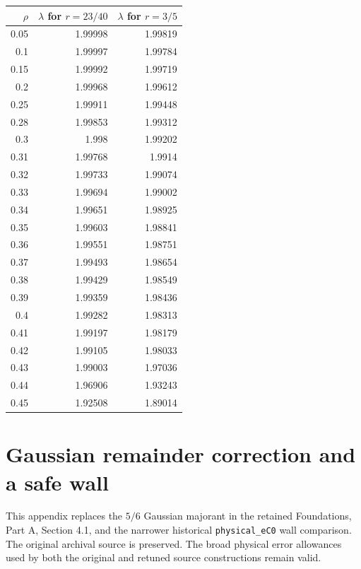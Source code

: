 \documentclass[11pt,a4paper]{article}
\theoremstyle{definition}\newtheorem{definition}[theorem]{Definition}
\theoremstyle{remark}\newtheorem{remark}[theorem]{Remark}
\begin{document}
\begin{center}\small
\begin{tabular}{@{}rrr@{}}\toprule
$\rho$ & $\lambda$ for $r=23/40$ & $\lambda$ for $r=3/5$\\\midrule
0.05 & 1.99998 & 1.99819\\
0.1 & 1.99997 & 1.99784\\
0.15 & 1.99992 & 1.99719\\
0.2 & 1.99968 & 1.99612\\
0.25 & 1.99911 & 1.99448\\
0.28 & 1.99853 & 1.99312\\
0.3 & 1.998 & 1.99202\\
0.31 & 1.99768 & 1.9914\\
0.32 & 1.99733 & 1.99074\\
0.33 & 1.99694 & 1.99002\\
0.34 & 1.99651 & 1.98925\\
0.35 & 1.99603 & 1.98841\\
0.36 & 1.99551 & 1.98751\\
0.37 & 1.99493 & 1.98654\\
0.38 & 1.99429 & 1.98549\\
0.39 & 1.99359 & 1.98436\\
0.4 & 1.99282 & 1.98313\\
0.41 & 1.99197 & 1.98179\\
0.42 & 1.99105 & 1.98033\\
0.43 & 1.99003 & 1.97036\\
0.44 & 1.96906 & 1.93243\\
0.45 & 1.92508 & 1.89014\\
\bottomrule\end{tabular}
\end{center}
\section{Gaussian remainder correction and a safe wall}\label{app:gaussian}
This appendix replaces the $5/6$ Gaussian majorant in the retained
Foundations, Part A, Section 4.1, and the narrower historical
\nolinkurl{physical_eC0} wall comparison. The original archival source is
preserved. The broad physical error allowances used by both the original and retuned
source constructions remain valid.
\end{document}
